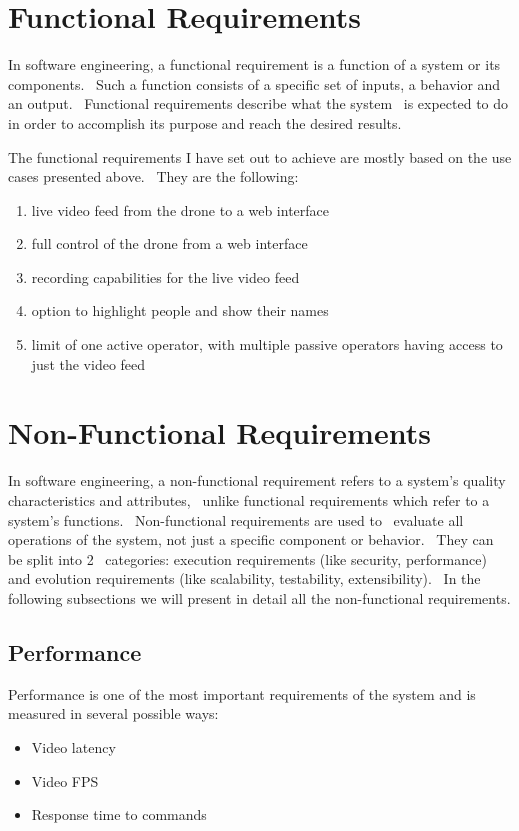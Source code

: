 \section{Functional Requirements}
\label{sec:functional-requirements}

In software engineering, a functional requirement is a function of a system or its components. \
Such a function consists of a specific set of inputs, a behavior and an output. \
Functional requirements describe what the system \
is expected to do in order to accomplish its purpose and reach the desired results.

The functional requirements I have set out to achieve are mostly based on the use cases presented above. \
They are the following:
\begin{enumerate}
    \item live video feed from the drone to a web interface
    \item full control of the drone from a web interface
    \item recording capabilities for the live video feed
    \item option to highlight people and show their names
    \item limit of one active operator, with multiple passive operators having access to just the video feed
\end{enumerate}

\section{Non-Functional Requirements}
\label{sec:non-functional-requirements}

In software engineering, a non-functional requirement refers to a system's quality characteristics and attributes, \
unlike functional requirements which refer to a system's functions. \
Non-functional requirements are used to \
evaluate all operations of the system, not just a specific component or behavior. \
They can be split into 2 \
categories: execution requirements (like security, performance) and evolution requirements (like scalability,
testability, extensibility). \
In the following subsections we will present in detail all the non-functional requirements.

\subsection{Performance}
\label{subsec:specification-performance}
Performance is one of the most important requirements of the system and is measured in several possible ways:
\begin{itemize}
    \item Video latency
    \item Video FPS
    \item Response time to commands
\end{itemize}

